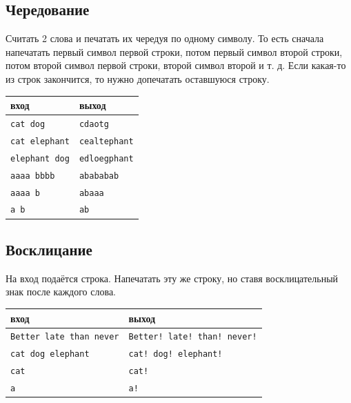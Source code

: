 \documentclass{article}
\begin{document}
\subsection{Чередование}
Считать 2 слова и печатать их чередуя по одному символу. То есть сначала напечатать первый символ первой строки, потом первый символ второй строки, потом второй символ первой строки, второй символ второй и т. д. Если какая-то из строк закончится, то нужно допечатать оставшуюся строку.
\begin{center}
\begin{tabular}{ l | l }
 вход & выход \\ \hline
 \texttt{cat dog} & \texttt{cdaotg}  \\ 
 \texttt{cat elephant} & \texttt{cealtephant} \\
 \texttt{elephant dog} & \texttt{edloegphant} \\
 \texttt{aaaa bbbb} & \texttt{abababab} \\
 \texttt{aaaa b} & \texttt{abaaa}\\ 
 \texttt{a b} & \texttt{ab}\\ 
\end{tabular}
\end{center}

\subsection{Восклицание}
На вход подаётся строка. Напечатать эту же строку, но ставя восклицательный знак после каждого слова.
\begin{center}
\begin{tabular}{ l | l }
 вход & выход \\ \hline
 \texttt{Better late than never} & \texttt{Better! late! than! never!} \\
 \texttt{cat \quad dog elephant} & \texttt{cat! \quad dog! elephant!}  \\ 
 \texttt{cat} & \texttt{cat!} \\
 \texttt{a} & \texttt{a!} \\
\end{tabular}
\end{center}
\end{document}
